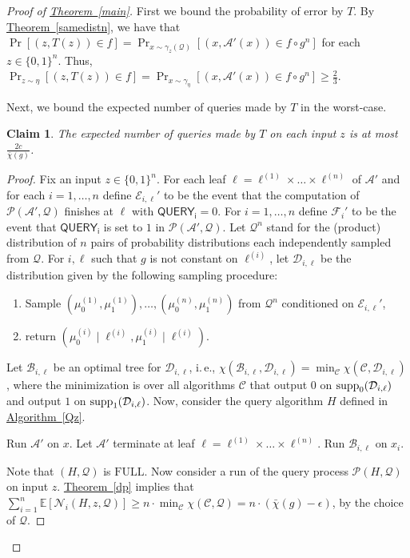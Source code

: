 \documentclass[11pt]{article}
\numberwithin{equation}{section}
\newtheorem{claim}[theorem]{Claim}
\theoremstyle{definition}
\theoremstyle{plain}
\newcommand{\ie}{i.\,e.}
\newcommand{\expref}[2]{\hyperref[#2]{#1~\ref{#2}}}
\newcommand{\full}{\text{FULL}}
\newcommand\supp{\mathop{\rm supp}}
\newcommand{\cA}{\mathcal{A}}
\newcommand{\clB}{\mathcal{B}}
\newcommand{\clC}{\mathcal{C}}
\newcommand{\clQ}{\mathcal{Q}}
\newcommand{\clP}{\mathcal{P}}
\newcommand{\clN}{\mathcal{N}}
\newcommand{\clD}{\mathcal{D}}
\newcommand{\E}{\mathbb{E}}
\begin{document}
\begin{proof}[Proof of {\expref{Theorem}{main}}]
First we bound the probability of error by $T$. By \expref{Theorem}{samedistn}, we have that
$\Pr[(z, T(z)) \in f]= \Pr_{x \sim \gamma_z(\clQ)}[(x,\cA'(x)) \in f \circ g^n]$ for each $z \in \{0,1\}^n$. 
Thus, $\Pr_{z \sim \eta}[(z, T(z)) \in f]=\Pr_{x \sim \gamma_\eta}[(x,\cA'(x)) \in f \circ g^n] \geq \frac{2}{3}$.

Next, we bound the expected number of queries made by $T$ in the worst-case.
\begin{claim}
The expected number of queries made by $T$ on each input $z$ is at most $\frac{2c}{\bar \chi(g)}$.
\end{claim}

\begin{proof}
Fix an input $z \in \{0,1\}^n$. For each leaf $\ell=\ell^{(1)} \times \ldots \times \ell^{(n)}$ of $\cA'$ and for each $i=1, \ldots, n$ define $\mathcal{E}_{i, \ell}'$ to be the event that the computation of $\clP(\cA',\clQ)$ finishes at $\ell$ with 
$\mathsf{QUERY_i}=0$. For $i=1, \ldots,n$ define $\mathcal{F}_i'$ to be the event that $\mathsf{QUERY_i}$ is set to $1$ in $\clP(\cA',\clQ)$. Let $\clQ^n$ stand for the (product) distribution of $n$ pairs of probability distributions each independently sampled from $\clQ$. For $i, \ell$ such that $g$ is not constant on $\ell^{(i)}$, let $\clD_{i, \ell}$ be the distribution given by the following sampling procedure:
\begin{enumerate}
\item Sample $(\mu_0^{(1)}, \mu_1^{(1)}), \ldots, (\mu_0^{(n)}, \mu_1^{(n)})$ from $\clQ^n$ conditioned on $\mathcal{E}_{i,\ell}'$,
\item return $(\mu_0^{(i)} \mid \ell^{(i)}, \mu_1^{(i)} \mid \ell^{(i)})$.
\end{enumerate}Let $\clB_{i,\ell}$ be an optimal tree for $\clD_{i,\ell}$, \ie, $\chi(\clB_{i,\ell},\clD_{i,\ell})=\min_{\clC}\chi(\clC, \clD_{i,\ell})$, where the minimization is over all algorithms $\clC$ that output $0$ on 
$\supp_0(\clD_{i,\ell})$ and output $1$ on $\supp_1(\clD_{i,\ell})$. Now, consider the query algorithm $H$ defined in \expref{Algorithm}{Qz}.
\begin{algorithm}[!h]
\DontPrintSemicolon
\caption{ $H$}
\label{Qz}
Run $\cA'$ on $x$. \;\label{runT}
Let $\cA'$ terminate at leaf $\ell=\ell^{(1)} \times \ldots \times\ell^{(n)}$. \;
{
{Run $\clB_{i, \ell}$ on $x_i$. \; \label{runP}}}
\end{algorithm}
Note that $(H, \clQ)$ is $\full$. Now consider a run of the query process $\clP(H, \clQ)$ on input $z$. \expref{Theorem}{dp} implies that $\sum_{i=1}^n \E[\clN_i(H,z, \clQ)] \geq n \cdot \min_{\clC} \chi(\clC,\clQ) =n \cdot (\bar\chi(g)-\epsilon)$, 
by the choice of $\clQ$. 


\end{proof}
\end{proof}
\end{document}
